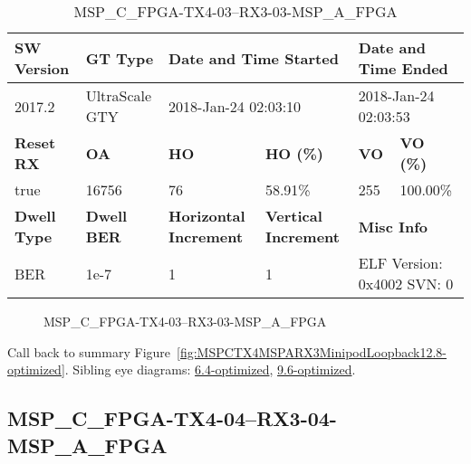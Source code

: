 \begin{table}[h]
\centering
\caption{MSP\_C\_FPGA-TX4-03--RX3-03-MSP\_A\_FPGA}
\label{tab:MSPCFPGATX403RX303MSPAFPGA12.8-optimized}
\begin{tabular}{@{}|l|l|l|l|l|l|@{}}
\toprule
\textbf{SW Version}                & \textbf{GT Type}   & \multicolumn{2}{l|}{\textbf{Date and Time Started}}            & \multicolumn{2}{l|}{\textbf{Date and Time Ended}}        \\ \midrule
2017.2                       & UltraScale GTY          & \multicolumn{2}{l|}{2018-Jan-24 02:03:10}                   & \multicolumn{2}{l|}{2018-Jan-24 02:03:53}               \\ \midrule
\textbf{Reset RX}                  & \textbf{OA} & \textbf{HO}   & \textbf{HO (\%)} & \textbf{VO} & \textbf{VO (\%)} \\ \midrule
true & 16756        & 76          & 58.91\%        & 255        & 100.00\%       \\ \midrule
\textbf{Dwell Type}                & \textbf{Dwell BER} & \textbf{Horizontal Increment} & \textbf{Vertical Increment}    & \multicolumn{2}{l|}{\textbf{Misc Info}}                  \\ \midrule
BER                            & 1e-7        & 1        & 1           & \multicolumn{2}{l|}{ELF Version: 0x4002 SVN: 0}                         \\ \bottomrule
\end{tabular}
\end{table}

\begin{figure}[h]
\caption{MSP\_C\_FPGA-TX4-03--RX3-03-MSP\_A\_FPGA} \label{fig:MSPCFPGATX403RX303MSPAFPGA12.8-optimized}
\end{figure}

Call back to summary Figure~\ref{fig:MSPCTX4MSPARX3MinipodLoopback12.8-optimized}.
Sibling eye diagrams: \hyperref[sec:MSPCFPGATX403RX303MSPAFPGA6.4-optimized]{6.4-optimized}, \hyperref[sec:MSPCFPGATX403RX303MSPAFPGA9.6-optimized]{9.6-optimized}.

\clearpage
\newpage


\subsection{MSP\_C\_FPGA-TX4-04--RX3-04-MSP\_A\_FPGA}\label{sec:MSPCFPGATX404RX304MSPAFPGA12.8-optimized}

